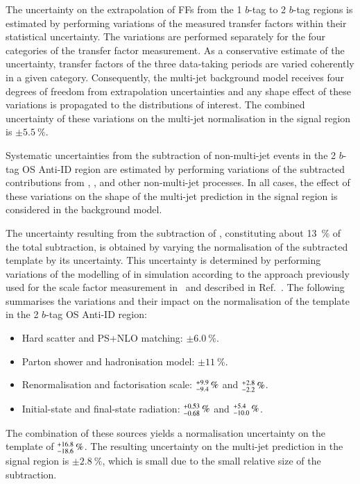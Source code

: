 The uncertainty on the extrapolation of FFs from the 1 $b$-tag to 2 $b$-tag
regions is estimated by performing variations of the measured transfer factors
within their statistical uncertainty. The variations are performed separately
for the four categories of the transfer factor measurement. As a conservative
estimate of the uncertainty, transfer factors of the three data-taking periods
are varied coherently in a given category. Consequently, the multi-jet
background model receives four degrees of freedom from extrapolation
uncertainties and any shape effect of these variations is propagated to the
distributions of interest. The combined uncertainty of these variations on the
multi-jet normalisation in the signal region is $\pm \SI{5.5}{\percent}$.

Systematic uncertainties from the subtraction of non-multi-jet events
in the 2 $b$-tag OS Anti-ID region are estimated by performing
variations of the subtracted contributions from \ttbarTrue,
\ttbarFakes, and other non-multi-jet processes. In all cases, the
effect of these variations on the shape of the multi-jet prediction in
the signal region is considered in the background model.

The uncertainty resulting from the subtraction of \ttbarTrue,
constituting about \SI{13}{\percent} of the total subtraction, is
obtained by varying the normalisation of the subtracted \ttbarTrue
template by its uncertainty. This uncertainty is determined by
performing variations of the modelling of \ttbar in simulation
according to the approach previously used for the \ttbarFakes scale
factor measurement in~ and described
in Ref.~\cite{ATL-PHYS-PUB-2020-023}. The following summarises the
variations and their impact on the normalisation of the \ttbarTrue
template in the 2 $b$-tag OS Anti-ID region:
\begin{itemize}
\item Hard scatter and PS+NLO matching: $\pm\SI{6.0}{\percent}$.
\item Parton shower and hadronisation model: $\pm\SI{11}{\percent}$.
\item Renormalisation and factorisation scale:
  $\numpmerr{+9.9}{-9.4}\valuesep{\si{\percent}}$ and
  $\numpmerr{+2.8}{-2.2}\valuesep{\si{\percent}}$.

\item Initial-state and final-state radiation:
  $\numpmerr{+0.53}{-0.68}\valuesep{\si{\percent}}$ and
  $\numpmerr{+5.4}{-10.0}\valuesep{\si{\percent}}$.
\end{itemize}
The combination of these sources yields a normalisation uncertainty on
the \ttbarTrue template of
$\numpmerr{+16.8}{-18.6}\valuesep{\si{\percent}}$. The resulting
uncertainty on the multi-jet prediction in the signal region is
$\pm \SI{2.8}{\percent}$, which is small due to the small relative
size of the \ttbarTrue subtraction.

